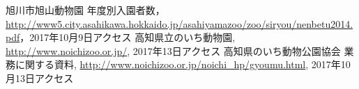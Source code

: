 \documentclass[a4j]{jarticle}
\begin{document}

\begin{thebibliography}{9}
旭川市旭山動物園 年度別入園者数，\url{http://www5.city.asahikawa.hokkaido.jp/asahiyamazoo/zoo/siryou/nenbetu2014.pdf}，2017年10月9日アクセス
高知県立のいち動物園, \url{http://www.noichizoo.or.jp/}, 2017年13日アクセス  
  高知県のいち動物公園協会 業務に関する資料, \url{http://www.noichizoo.or.jp/noichi_hp/gyoumu.html}, 2017年10月13日アクセス

\end{thebibliography}
\end{document}
